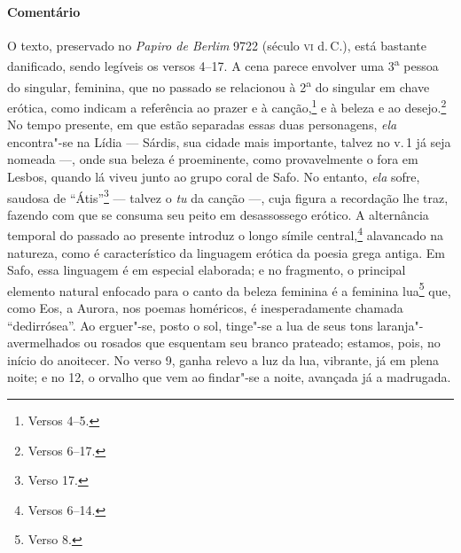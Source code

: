 \medskip

{\paragraph{Comentário} O texto, preservado no \emph{Papiro de Berlim} 9722 (século \textsc{vi}
d.\,C.), está bastante danificado, sendo legíveis os versos 4--17.
A cena parece envolver uma 3\textsuperscript{a} pessoa do
singular, feminina, que no passado se relacionou à 2\textsuperscript{a} do
singular em chave erótica, como indicam a referência ao prazer e à canção,\footnote{Versos 4--5.} e à beleza e ao desejo.\footnote{Versos 6--17.} No tempo presente, 
em que estão separadas essas duas personagens, \emph{ela} encontra"-se na Lídia --- Sárdis, sua cidade mais importante, talvez no v.\,1 já seja nomeada ---, onde sua beleza é proeminente, como provavelmente o fora em Lesbos, quando lá viveu junto ao grupo coral de Safo. No entanto, \emph{ela} sofre, saudosa de ``Átis''\footnote{Verso 17.} --- talvez o \emph{tu} da canção ---, cuja figura a recordação lhe traz, fazendo
com que se consuma seu peito em desassossego erótico. A alternância temporal do
passado ao presente introduz o longo símile central,\footnote{Versos 6--14.} alavancado
na natureza, como é característico da linguagem erótica da poesia grega antiga.
Em Safo, essa linguagem é em especial elaborada; e no fragmento, o principal
elemento natural enfocado para o canto da beleza feminina é a feminina lua\footnote{Verso 8.} que, como Eos, a Aurora, nos poemas homéricos, é inesperadamente
chamada ``dedirrósea''. Ao erguer"-se, posto o sol, tinge"-se a lua
de seus tons laranja"-avermelhados ou rosados que esquentam seu branco prateado;
estamos, pois, no início do anoitecer. No verso 9, ganha relevo a luz da lua,
vibrante, já em plena noite; e no 12, o orvalho que vem ao findar"-se a noite,
avançada já a madrugada.

}
